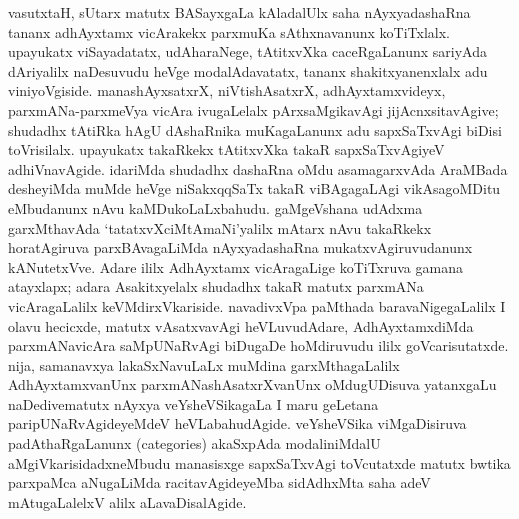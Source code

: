 vasutxtaH, sUtarx matutx BASayxgaLa kAladalUlx saha nAyxyadashaRna tananx \hbox{adhAyxtamx} vicArakekx parxmuKa sAthxnavanunx koTiTxlalx. upayukatx viSayadatatx, udAharaNege, tAtitxvXka caceRgaLanunx sariyAda dAriyalilx naDesuvudu heVge modalAdavatatx, tananx shakitxyanenxlalx adu viniyoVgiside. manashAyxsatxrX, niVtishAsatxrX, adhAyxtamxvideyx, parxmANa-parxmeVya vicAra ivugaLelalx pArxsaMgikavAgi jijAcnxsitavAgive; shudadhx tAtiRka hAgU dAshaRnika muKagaLanunx adu sapxSaTxvAgi biDisi toVrisilalx. upayukatx takaRkekx tAtitxvXka takaR sapxSaTxvAgiyeV adhiVnavAgide. idariMda shudadhx dashaRna oMdu asa\-magarxvAda AraMBada desheyiMda muMde heVge niSakxqqSaTx takaR viBAgagaLAgi vikAsa\-goMDitu eMbudanunx nAvu kaMDukoLaLxbahudu. gaMgeVshana udAdxma garxMthavAda `tatatxvXciMtAmaNi'yalilx mAtarx nAvu takaRkekx horatAgiruva parxBAvagaLiMda nAyxya\-dashaRna mukatxvAgiruvudanunx kANutetxVve. Adare ililx AdhAyxtamx vicAragaLige koTiTx\-ruva gamana atayxlapx; adara Asakitxyelalx shudadhx takaR matutx parxmANa vicAragaLalilx keVMdirxVkariside. navadivxVpa paMthada baravaNigegaLalilx I olavu hecicxde, matutx vAsatxva\-vAgi heVLuvudAdare, AdhAyxtamxdiMda parxmANavicAra saMpUNaRvAgi biDugaDe hoMdiruvudu ililx goVcarisutatxde. nija, samanavxya lakaSxNavuLaLx muMdina garxMtha\-gaLalilx AdhAyxtamxvanUnx parxmANashAsatxrXvanUnx oMdugUDisuva yatanxgaLu naDedive\break matutx nAyxya veYsheVSikagaLa I maru geLetana paripUNaRvAgideyeMdeV heVLa\-bahu\-dAgide. veYsheVSika viMgaDisiruva padAthaRgaLanunx ({\rm categories}) akaSxpAda moda\-liniMdalU aMgiVkarisidadxneMbudu manasisxge sapxSaTxvAgi toVcutatxde matutx bwtika parxpaMca aNugaLiMda racitavAgideyeMba sidAdhxMta saha adeV mAtugaLalelxV alilx aLavaDisalAgide.

